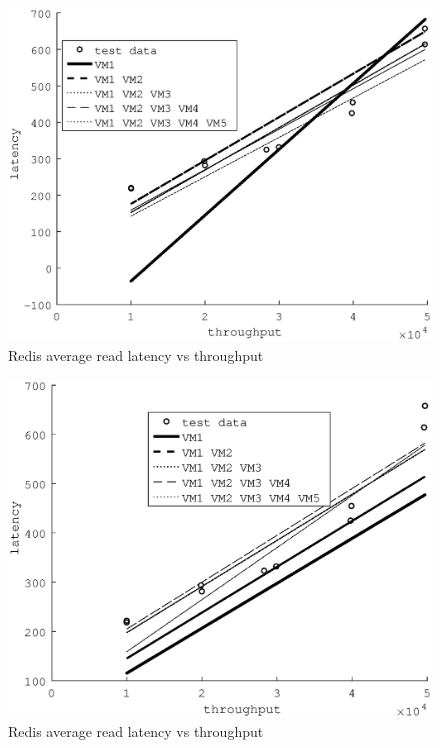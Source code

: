 \documentclass{acm_proc_article-sp}
\begin{document}
\begin{figure}
\centering
\includegraphics[scale = 0.5]{fit_read_avg_latency_r3__r3_2x_m3_2x_m3__m3_x_r3_x.eps}
\caption{Redis average read latency vs throughput}
\label{figure:redisbarread}
\end{figure}


\begin{figure}
\centering
\includegraphics[scale = 0.5]{fit_read_avg_latency_r3_2x_r3_x_m3_2x_m3_x_r3__m3_.eps}
\caption{Redis average read latency vs throughput}
\label{figure:redisbarread}
\end{figure}
\end{document}

